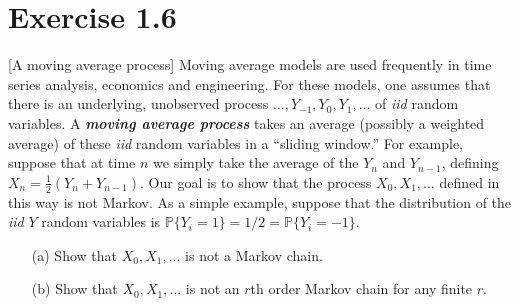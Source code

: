 \documentclass{article}
\begin{document}
\section*{Exercise 1.6}
[A moving average process] Moving average models are used frequently in time series analysis, economics and engineering. For these models, one assumes that there is an underlying, unobserved process $\ldots, Y_{-1}, Y_0, Y_1, \ldots$ of \textit{iid} random variables. A \textbf{\textit{moving average process}} takes an average (possibly a weighted average) of these \textit{iid} random variables in a “sliding window.” For example, suppose that at time $n$ we simply take the average of the $Y_n$ and $Y_{n-1}$, defining $X_n = \frac{1}{2}(Y_n + Y_{n-1})$. Our goal is to show that the process $X_0, X_1, \ldots$ defined in this way is not Markov. As a simple example, suppose that the distribution of the \textit{iid} $Y$ random variables is $\mathbb{P}\{Y_i = 1\} = 1/2 = \mathbb{P}\{Y_i = -1\}$.

\begin{enumerate}
    \item[(a)] Show that $X_0, X_1, \ldots$ is not a Markov chain.
    \item[(b)] Show that $X_0, X_1, \ldots$ is not an $r$th order Markov chain for any finite $r$.
\end{enumerate}
\end{document}
